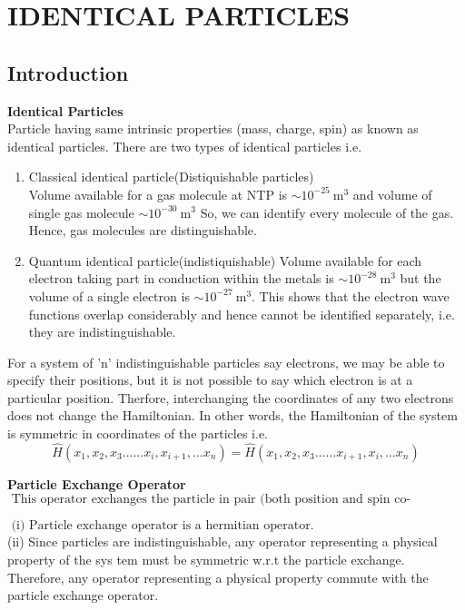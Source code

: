 \chapter{IDENTICAL PARTICLES}
\section{Introduction}
\textbf{Identical Particles}\\
Particle having same intrinsic properties (mass, charge, spin) as known as identical particles. There are two types of identical particles i.e.
\begin{enumerate}
	\item Classical identical particle(Distiquishable particles)\\
	Volume available for a gas molecule at NTP is $\sim 10^{-25} \mathrm{~m}^{3}$ and volume of single gas molecule $\sim 10^{-30} \mathrm{~m}^{3}$ So, we can identify every molecule of the gas. Hence, gas molecules are distinguishable.
	\item Quantum identical particle(indistiquishable)
	Volume available for each electron taking part in conduction within the metals is $\sim 10^{-28} \mathrm{~m}^{3}$ but the volume of a single electron is $\sim 10^{-27} \mathrm{~m}^{3}$. This shows that the electron wave functions overlap considerably and hence cannot be identified separately, i.e. they are indistinguishable.
\end{enumerate}
\begin{note}
	For a system of 'n' indistinguishable particles say electrons, we may be able to specify their positions, but it is not possible to say which electron is at a particular position. Therfore, interchanging the coordinates of any two electrons does not change the Hamiltonian. In other words, the Hamiltonian of the system is symmetric in coordinates of the particles i.e.
	$$
	\hat{H}\left(x_{1}, x_{2}, x_{3} \ldots \ldots x_{i}, x_{i+1}, \ldots x_{n}\right)=\hat{H}\left(x_{1}, x_{2}, x_{3} \ldots \ldots x_{i+1}, x_{i}, \ldots x_{n}\right)
	$$
	\end{note}
\textbf{Particle Exchange Operator}\\
$\text { This operator exchanges the particle in pair (both position and spin co-ordinates). }$
\begin{note}
	$\text { (i) Particle exchange operator is a hermitian operator. }$\\
	(ii) Since particles are indistinguishable, any operator representing a physical property of the sys tem must be symmetric w.r.t the particle exchange. Therefore, any operator representing a physical property commute with the particle exchange operator.
\end{note}
